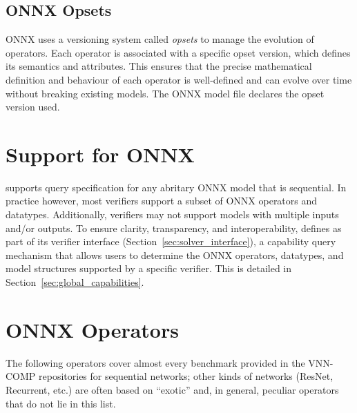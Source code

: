 \subsection{ONNX Opsets}
ONNX uses a versioning system called \emph{opsets} to manage the evolution of operators. Each operator is associated with a specific opset version, which defines its semantics and attributes.
This ensures that the precise mathematical definition and behaviour of each operator is well-defined and can evolve over time without breaking existing models. The ONNX model file declares the opset
version used.
	
\section{\vnnlib{} Support for ONNX}
\label{sec:onnx_support}
\vnnlib{} supports query specification for any abritary ONNX model that is sequential. In practice however, most verifiers support a subset of ONNX operators and datatypes. Additionally, verifiers may not support
models with multiple inputs and/or outputs. To ensure clarity, transparency, and interoperability, \vnnlib{} defines as part of its verifier interface (Section~\ref{sec:solver_interface}), a capability query 
mechanism that allows users to determine the ONNX operators, datatypes, and model structures supported by a specific verifier. This is detailed in Section~\ref{sec:global_capabilities}.

\section{ONNX Operators}
\label{sec:supported_operators}
The following operators cover almost every benchmark provided in the
VNN-COMP repositories for sequential networks; other kinds of networks
(ResNet, Recurrent, etc.) are often based on ``exotic'' and, in general,
peculiar operators that do not lie in this list.

